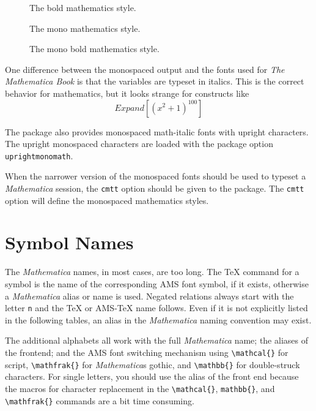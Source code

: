 \documentclass{article}
\newcommand{\Math}{\textit{Mathematica}\xspace}
\begin{document}
\begin{figure}
\boldmath\mathsample
\caption{The bold mathematics style.}\label{Fig:mathbold}
\end{figure}

\begin{figure}
\monomath\mathsample
\caption{The mono mathematics style.}\label{Fig:mathmono}
\end{figure}

\begin{figure}
\monoboldmath\mathsample
\caption{The mono bold mathematics style.}\label{Fig:mathmonobold}
\end{figure}

\begin{sloppypar}
One difference between the monospaced output and the fonts used for
\textit{The Mathematica Book} is that the variables are typeset in
italics.  This is the correct behavior for mathematics, but it looks
strange for constructs like
$$Expand[(x^2+1)^{100}]$$
\end{sloppypar}

The package also provides monospaced 
math-italic fonts with upright characters. 
The upright monospaced characters are loaded with the 
package option \texttt{uprightmonomath}.

When the narrower version of the monospaced fonts should be used to
typeset a \Math{} session, the \texttt{cmtt} option should be given to
the package. The \texttt{cmtt} option will define the monospaced
mathematics styles.


\section{Symbol Names}

The \Math{} names, in most cases, are too long. The \TeX{} command
for a symbol is the name of the corresponding AMS font symbol, if it
exists, otherwise a \Math{} alias or name is used.  Negated
relations always start with the letter \texttt{n} and the \TeX{} or
AMS-\TeX{} name follows. Even if it is not explicitly listed in the
following tables, an alias in the \Math{} naming convention
may exist.

\begin{sloppypar}
The additional alphabets all work with the full \Math{} name; the
aliases of the frontend; and the AMS font switching mechanism using
\verb|\mathcal{}| for script, \verb|\mathfrak{}| for \Math{}s
gothic, and \verb|\mathbb{}| for double-struck characters. For single
letters, you should use the alias of the front end because the macros
for character replacement in the \verb|\mathcal{}|, \verb|mathbb{}|,
and \verb|\mathfrak{}| commands are a bit time consuming.
\end{sloppypar}
\end{document}
